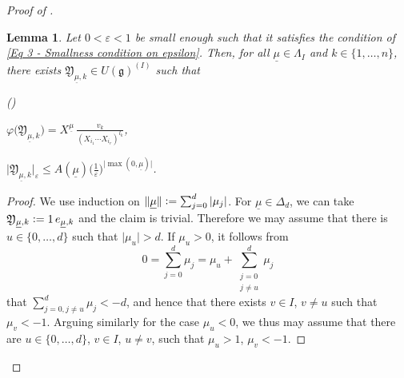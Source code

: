 \documentclass[a4paper, reqno, 10pt]{amsart}
\newtheorem{lemma}[theorem]{Lemma}
\theoremstyle{definition}
\newenvironment{altenumeratelevel2}
{\begin{list}
		{\textup{(\theenumi)} }
		{\usecounter{enumii}
			\setlength{\labelwidth}{2em}
			\setlength{\labelsep}{0pt}
			\setlength{\leftmargin}{2em}
			\setlength{\itemsep}{2pt}
			\setlength{\topsep}{2pt}
			\setlength{\itemindent}{0pt}
			\renewcommand{\theenumi}{\arabic{enumii}}
	}}
	{\end{list}}
\numberwithin{equation}{section}
\newcommand{\abs}[1]{{\lvert{#1}\rvert}}
\newcommand{\defeq}{\vcentcolon=}
\newcommand{\ul}[1]{{\underline{#1}}}
\newcommand{\Fg}{{\mathfrak {g}}}
\newcommand{\FY}{{\mathfrak {Y}}}
\begin{document}
\begin{proof}[{Proof of }]
\begin{lemma}\label{Lemma 3 - Existence of good preimages}
	Let $0<\varepsilon <1$ be small enough such that it satisfies the condition of \eqref{Eq 3 - Smallness condition on epsilon}.
	Then, for all $\ul{\mu} \in \Lambda_I$ and $k\in \{1,\ldots,n\}$, there exists $\FY_{\ul{\mu},k} \in U(\Fg)^{(I)}$ such that
	\begin{altenumeratelevel2}
		\item
			$ \displaystyle \varphi \big(\FY_{\ul{\mu},k} \big) = X^\ul{\mu} \, \frac{v_k}{(X_{i_1}\cdots X_{i_r})^{l_k}}$,
		\item
			$ \displaystyle \big\lvert \FY_{\ul{\mu},k} \big\rvert_\varepsilon \leq A(\ul{\mu}) \bigg( \frac{1}{\varepsilon}\bigg)^\abs{\max(0,\ul{\mu})}$.
	\end{altenumeratelevel2}
\end{lemma}
\begin{proof}
	We use induction on $\lVert \ul{\mu} \rVert \defeq \sum_{j=0}^d \abs{\mu_j}$.
	For $\ul{\mu} \in \Delta_d$, we can take $\FY_{\ul{\mu},k} \defeq 1 \, e_{\ul{\mu},k}$ and the claim is trivial.
	Therefore we may assume that there is $u \in \{0,\ldots,d\}$ such that $\abs{ \mu_u} > d$.
	If $\mu_u > 0$, it follows from 
	\[0 = \sum_{j=0}^d \mu_j = \mu_u + \sum_{\substack{j=0 \\ j\neq u}}^d \mu_j \]
	that $\sum_{j=0, j\neq u}^d \mu_j < -d$, and hence that there exists $v \in I$, $v \neq u$ such that $\mu_v < -1$.
	Arguing similarly for the case $\mu_u < 0$, we thus may assume that there are $u \in \{0,\ldots,d\}$, $v\in I$, $u \neq v$, such that $\mu_u >1$, $\mu_v < -1$.
	


\end{proof}
\end{proof}
\end{document}
